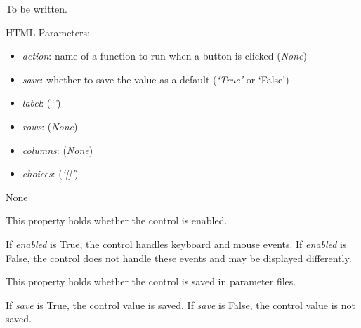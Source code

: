 \documentclass[letterpaper,10pt,english]{sphinxmanual}
\begin{document}
\begin{fulllineitems}
\label{api:controls.RadioButtonBox}
To be written.

HTML Parameters:
\begin{itemize}
\item {} 
\emph{action}: name of a function to run when a button is clicked (\emph{None})

\item {} 
\emph{save}: whether to save the value as a default (\emph{`True'} or `False')

\item {} 
\emph{label}: (\emph{`'})

\item {} 
\emph{rows}: (\emph{None})

\item {} 
\emph{columns}: (\emph{None})

\item {} 
\emph{choices}: (\emph{`{[}{]}'})

\end{itemize}

\begin{fulllineitems}
\label{api:controls.RadioButtonBox.action}
None

\end{fulllineitems}


\begin{fulllineitems}
\label{api:controls.RadioButtonBox.enabled}
This property holds whether the control is enabled.

If \emph{enabled} is True, the control handles keyboard and mouse events.
If \emph{enabled} is False, the control does not handle these events and may
be displayed differently.

\end{fulllineitems}


\begin{fulllineitems}
\label{api:controls.RadioButtonBox.save}
This property holds whether the control is saved in parameter files.

If \emph{save} is True, the control value is saved.
If \emph{save} is False, the control value is not saved.


\end{fulllineitems}
\end{fulllineitems}
\end{document}
